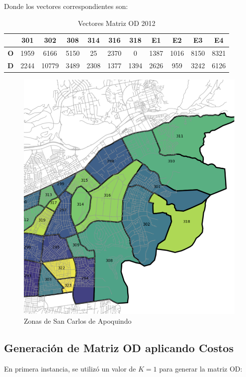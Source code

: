 \documentclass[12pt]{article} %
\begin{document}
Donde los vectores correspondientes son:

\begin{table}[H]
  \centering
  \footnotesize
  \begin{tabular}{c|cccccccccc}    
  \textbf{} & \textbf{301} & \textbf{302} & \textbf{308} & \textbf{314} & \textbf{316} & \textbf{318} & \textbf{E1} & \textbf{E2} & \textbf{E3} & \textbf{E4} \\ \hline
  \textbf{O} & 1959 & 6166 & 5150 & 25 & 2370 & 0 & 1387 & 1016 & 8150 & 8321 \\ 
  \textbf{D} & 2244 & 10779 & 3489 & 2308 & 1377 & 1394 & 2626 & 959 & 3242 & 6126 \\ 
  \end{tabular}
  \caption{Vectores Matriz OD 2012}
  \label{table:data_matrix}
\end{table}

\begin{figure}[H]
  \centering
  \includegraphics[width=0.35\linewidth]{san_carlos.png}
  \caption{Zonas de San Carlos de Apoquindo}
  \label{fig:zonas}
\end{figure}

\subsection{Generación de Matriz OD aplicando Costos}

En primera instancia, se utilizó un valor de \(K = 1\) para generar la matriz OD:
\end{document}
